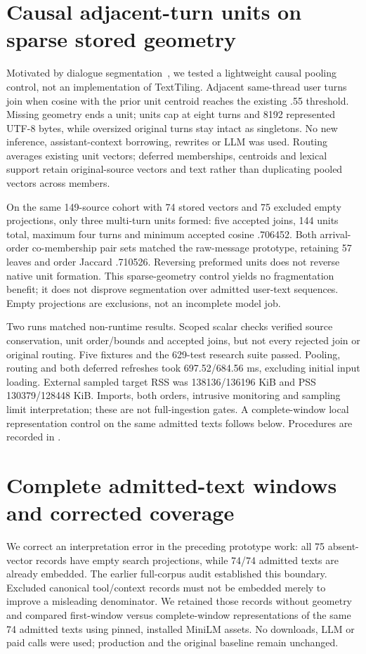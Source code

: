 \documentclass[11pt]{article}
\begin{document}
\section{Causal adjacent-turn units on sparse stored geometry}
Motivated by dialogue segmentation~\cite{texttiling}, we tested a lightweight
causal pooling control, not an implementation of TextTiling. Adjacent same-thread
user turns join when cosine with the prior unit centroid reaches the existing
.55 threshold. Missing geometry ends a unit; units cap at eight turns and
8192 represented UTF-8 bytes, while oversized original turns stay intact as
singletons. No new inference, assistant-context borrowing, rewrites or LLM was
used. Routing averages existing unit vectors; deferred memberships, centroids
and lexical support retain original-source vectors and text rather than
duplicating pooled vectors across members.

On the same 149-source cohort with 74 stored vectors and 75 excluded empty
projections,
only three multi-turn units formed: five accepted joins, 144 units total,
maximum four turns and minimum accepted cosine .706452. Both arrival-order
co-membership pair sets matched the raw-message prototype, retaining 57 leaves
and order Jaccard .710526. Reversing preformed units does not reverse native
unit formation. This sparse-geometry control yields no fragmentation benefit;
it does not disprove segmentation over admitted user-text sequences. Empty
projections are exclusions, not an incomplete model job.

Two runs matched non-runtime results. Scoped scalar checks verified source
conservation, unit order/bounds and accepted joins, but not every rejected join
or original routing. Five fixtures and the 629-test research suite passed.
Pooling, routing and both deferred refreshes took 697.52/684.56 ms, excluding
initial input loading. External sampled target RSS was 138136/136196 KiB and
PSS 130379/128448 KiB. Imports, both orders, intrusive monitoring and sampling
limit interpretation; these are not full-ingestion gates. A complete-window
local representation control on the same admitted texts follows below.
Procedures are recorded in
.

\section{Complete admitted-text windows and corrected coverage}
We correct an interpretation error in the preceding prototype work: all 75
absent-vector records have empty search projections, while 74/74 admitted texts
are already embedded. The earlier full-corpus audit established this boundary.
Excluded canonical tool/context records must not be embedded merely to improve
a misleading denominator. We retained those records without geometry and
compared first-window versus complete-window representations of the same 74
admitted texts using pinned, installed MiniLM assets. No downloads, LLM or paid
calls were used; production and the original baseline remain unchanged.
\end{document}
